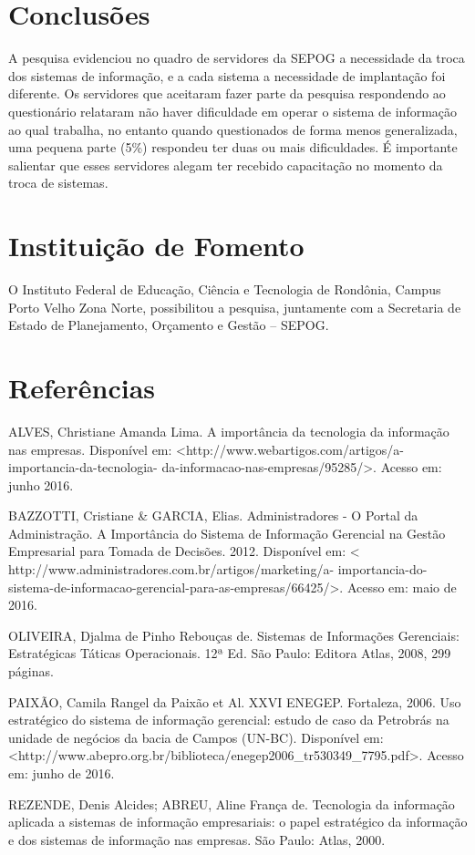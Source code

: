 \documentclass[article,12pt,onesidea,4paper,english,brazil]{abntex2}
\begin{document}
	
	\section*{Conclusões}
	
A pesquisa evidenciou no quadro de servidores da SEPOG a necessidade da troca dos sistemas de informação, e a cada sistema a necessidade de implantação foi diferente. Os servidores que aceitaram fazer parte da pesquisa respondendo ao questionário relataram não haver dificuldade em operar o sistema de informação ao qual trabalha, no entanto quando questionados de forma menos generalizada, uma pequena parte (5\%) respondeu ter duas ou mais dificuldades. É importante salientar que esses servidores alegam ter recebido capacitação no momento da troca de sistemas.
	
	\section*{Instituição de Fomento}
	
O Instituto Federal de Educação, Ciência e Tecnologia de Rondônia, Campus Porto Velho Zona Norte, possibilitou a pesquisa, juntamente com a Secretaria de Estado de Planejamento, Orçamento e Gestão – SEPOG.
	\section*{Referências}
	
	\sloppy
	
	
\noindent ALVES, Christiane Amanda Lima. A importância da tecnologia da informação nas empresas. Disponível em: <http://www.webartigos.com/artigos/a-importancia-da-tecnologia- da-informacao-nas-empresas/95285/>. Acesso em: junho 2016.

\noindent BAZZOTTI, Cristiane \& GARCIA, Elias. Administradores - O Portal da Administração. A Importância do Sistema de Informação Gerencial na Gestão Empresarial para Tomada de Decisões. 2012. Disponível em: < http://www.administradores.com.br/artigos/marketing/a- importancia-do-sistema-de-informacao-gerencial-para-as-empresas/66425/>. Acesso em: maio de 2016.

\noindent OLIVEIRA, Djalma de Pinho Rebouças de. Sistemas de Informações Gerenciais: Estratégicas Táticas Operacionais. 12ª Ed. São Paulo: Editora Atlas, 2008, 299 páginas.

\noindent PAIXÃO, Camila Rangel da Paixão et Al. XXVI ENEGEP. Fortaleza, 2006. Uso estratégico do sistema de informação gerencial: estudo de caso da Petrobrás na unidade de negócios da bacia de Campos (UN-BC). Disponível em:
<http://www.abepro.org.br/biblioteca/enegep2006\_tr530349\_7795.pdf>. Acesso em: junho de 2016.

\noindent REZENDE, Denis Alcides; ABREU, Aline França de. Tecnologia da informação aplicada a sistemas de informação empresariais: o papel estratégico da informação e dos sistemas de informação nas empresas. São Paulo: Atlas, 2000.
\end{document}
